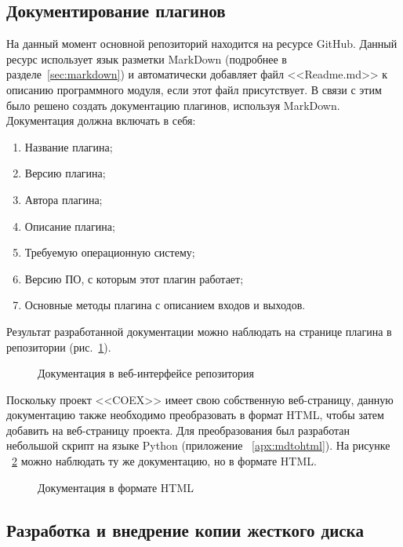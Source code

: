 \subsection{Документирование плагинов}

На данный момент основной репозиторий находится на ресурсе GitHub. Данный ресурс использует язык разметки MarkDown (подробнее в разделе~\ref{sec:markdown}) и автоматически добавляет файл <<Readme.md>> к описанию программного модуля, если этот файл присутствует. В связи с этим было решено создать документацию плагинов, используя MarkDown. Документация должна включать в себя:

\begin{enumerate}
  \item Название плагина;
  \item Версию плагина;
  \item Автора плагина;
  \item Описание плагина;
  \item Требуемую операционную систему;
  \item Версию ПО, с которым этот плагин работает;
  \item Основные методы плагина с описанием входов и выходов.
\end{enumerate}

Результат разработанной документации можно наблюдать на странице плагина в репозитории (рис.~\ref{bok_1:bok_1}).

\begin{figure}[!ht]
\caption{ Документация в веб-интерфейсе репозитория }
\label{bok_1:bok_1}
\end{figure}

Поскольку проект <<COEX>> имеет свою собственную веб-страницу, данную документацию также необходимо преобразовать в формат HTML, чтобы затем добавить на веб-страницу проекта. Для преобразования был разработан небольшой скрипт на языке Python (приложение ~\ref{apx:mdtohtml}). На рисунке ~\ref{bok_2:bok_2} можно наблюдать ту же документацию, но в формате HTML.

\begin{figure}[!ht]
\caption{ Документация в формате HTML }
\label{bok_2:bok_2}
\end{figure}

\clearpage
\subsection{Разработка и внедрение копии жесткого диска}


